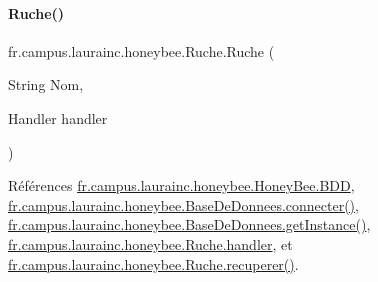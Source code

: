 \paragraph{\texorpdfstring{Ruche()}{Ruche()}\hspace{0.1cm}{\footnotesize\ttfamily [4/4]}}
{\footnotesize\ttfamily fr.\+campus.\+laurainc.\+honeybee.\+Ruche.\+Ruche (\begin{DoxyParamCaption}\item[{String}]{Nom,  }\item[{Handler}]{handler }\end{DoxyParamCaption})}



Références \hyperlink{classfr_1_1campus_1_1laurainc_1_1honeybee_1_1_honey_bee_abfb4f6cc1c8bb793c37ccb8408abc51c}{fr.\+campus.\+laurainc.\+honeybee.\+Honey\+Bee.\+B\+DD}, \hyperlink{classfr_1_1campus_1_1laurainc_1_1honeybee_1_1_base_de_donnees_a08564ea7dccde161d6eac4b8879401bb}{fr.\+campus.\+laurainc.\+honeybee.\+Base\+De\+Donnees.\+connecter()}, \hyperlink{classfr_1_1campus_1_1laurainc_1_1honeybee_1_1_base_de_donnees_a9c2484cfb87f90e46cf878eb7803abb2}{fr.\+campus.\+laurainc.\+honeybee.\+Base\+De\+Donnees.\+get\+Instance()}, \hyperlink{classfr_1_1campus_1_1laurainc_1_1honeybee_1_1_ruche_a9689ca454694434549e5fffca876ffae}{fr.\+campus.\+laurainc.\+honeybee.\+Ruche.\+handler}, et \hyperlink{classfr_1_1campus_1_1laurainc_1_1honeybee_1_1_ruche_a7a99d3c585f2c507eb2c6c265a5bb1fe}{fr.\+campus.\+laurainc.\+honeybee.\+Ruche.\+recuperer()}.


